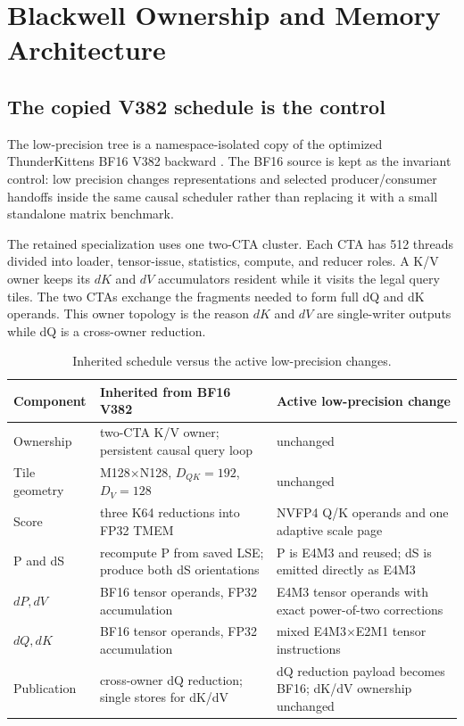 \section{Blackwell Ownership and Memory Architecture}

\subsection{The copied V382 schedule is the control}

The low-precision tree is a namespace-isolated copy of the optimized
ThunderKittens BF16 V382 backward \cite{thunderkittens}.  The BF16 source is
kept as the invariant control: low precision changes representations and
selected producer/consumer handoffs inside the same causal scheduler rather
than replacing it with a small standalone matrix benchmark.

The retained specialization uses one two-CTA cluster.  Each CTA has 512
threads divided into loader, tensor-issue, statistics, compute, and reducer
roles.  A K/V owner keeps its $dK$ and $dV$ accumulators resident while it
visits the legal query tiles.  The two CTAs exchange the fragments needed to
form full dQ and dK operands.  This owner topology is the reason $dK$ and
$dV$ are single-writer outputs while dQ is a cross-owner reduction.

\begin{table}[htbp]
\centering
\caption{Inherited schedule versus the active low-precision changes.}
\label{tab:inherited-vs-lowp}
\small
\begin{tabularx}{\textwidth}{p{}X X}
\toprule
Component & Inherited from BF16 V382 & Active low-precision change \\
\midrule
Ownership & two-CTA K/V owner; persistent causal query loop &
unchanged \\
Tile geometry & M128$\times$N128, $D_{QK}=192$, $D_V=128$ &
unchanged \\
Score & three K64 reductions into FP32 TMEM &
NVFP4 Q/K operands and one adaptive scale page \\
P and dS & recompute P from saved LSE; produce both dS orientations &
P is E4M3 and reused; dS is emitted directly as E4M3 \\
$dP,dV$ & BF16 tensor operands, FP32 accumulation &
E4M3 tensor operands with exact power-of-two corrections \\
$dQ,dK$ & BF16 tensor operands, FP32 accumulation &
mixed E4M3$\times$E2M1 tensor instructions \\
Publication & cross-owner dQ reduction; single stores for dK/dV &
dQ reduction payload becomes BF16; dK/dV ownership unchanged \\
\bottomrule
\end{tabularx}
\end{table}

